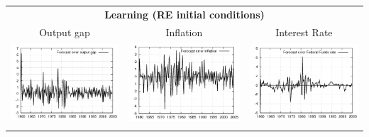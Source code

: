 \documentclass{beamer}
\begin{document}
{\begin{center}
\begin{tabular}{ccc}
  \multicolumn{3}{c}{\textbf{Learning (RE initial conditions)}}  \\
  \small{Output gap} & \small{Inflation} & \small{Interest Rate} \\
  \includegraphics[scale=0.23]{plots2/initre_Forecast_error_output_gap.png} & \includegraphics[scale=0.23]{plots2/initre_Forecast_error_inflation.png} & \includegraphics[scale=0.23]{plots2/initre_Forecast_error_Federal_Funds_rate.png} \\ \\
  \end{tabular}
  \end{center}
}
\end{document}
